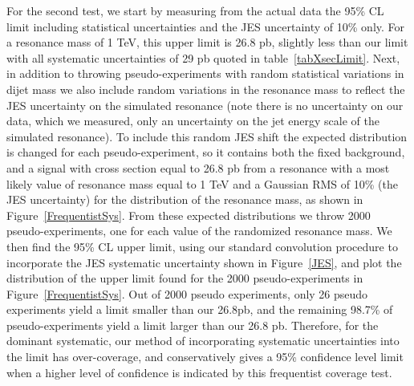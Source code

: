 For the second test, we start by measuring from the actual data the 95\% CL 
limit including statistical uncertainties and the JES uncertainty of 10\% only.
For a resonance mass of 1 TeV, this upper limit is 26.8 pb, slightly less than
our limit with all systematic uncertainties of 29 pb quoted in table~\ref{tabXsecLimit}.  Next, 
in addition to throwing pseudo-experiments with random
statistical variations in dijet mass we also include random variations in
the resonance mass to reflect the JES uncertainty on the simulated resonance (note there
is no uncertainty on our data, which we measured, only an uncertainty on the jet energy
scale of the simulated resonance).
To include this random JES shift the expected 
distribution is changed for each pseudo-experiment, so it contains both the 
fixed background, and a signal
with cross section equal to 26.8 pb from a resonance with 
a most likely value of resonance mass equal to 1 TeV and 
a Gaussian RMS of 10\% (the JES uncertainty) for the distribution of the resonance mass, as shown in Figure~\ref{FrequentistSys}.
From these expected distributions we throw 2000 pseudo-experiments, one for each
value of the randomized resonance mass.
We then find the 95\% CL upper limit, using our standard convolution procedure
to incorporate the JES systematic uncertainty shown in Figure~\ref{JES}, and 
plot the distribution of the upper limit found for the 2000 pseudo-experiments in
Figure~\ref{FrequentistSys}.  
Out of 2000 pseudo experiments, only 26 pseudo experiments
yield a limit smaller than our 26.8pb, and the remaining 98.7\% of pseudo-experiments
yield a limit larger than our 26.8 pb.  Therefore, for the dominant systematic,
our method of incorporating systematic uncertainties into the limit has 
over-coverage, and conservatively gives a 95\% confidence level limit when a higher level of
confidence is indicated by this frequentist coverage test. 

